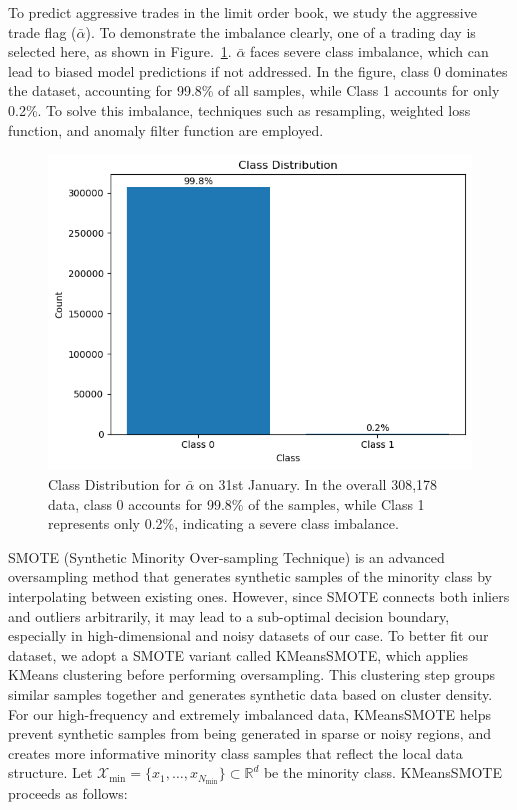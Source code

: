 To predict aggressive trades in the limit order book, we study the aggressive trade flag ($\bar{\alpha}$). To demonstrate the imbalance clearly, one of a trading day is selected here, as shown in Figure.~\ref{fig: aflag_class_distribution}. $\bar{\alpha}$ faces severe class imbalance, which can lead to biased model predictions if not addressed. In the figure, class 0 dominates the dataset, accounting for 99.8\% of all samples, while Class 1 accounts for only 0.2\%. To solve this imbalance, techniques such as resampling, weighted loss function, and anomaly filter function are employed. 
\begin{figure}[h]
    \centering
    \includegraphics[width=0.8\linewidth]{figures/Imbalaced data for aflag.png}
    \caption{Class Distribution for $\bar{\alpha}$ on 31st January. In the overall 308,178 data, class 0 accounts for 99.8\% of the samples, while Class 1 represents only 0.2\%, indicating a severe class imbalance.}
    \label{fig: aflag_class_distribution}
\end{figure}

SMOTE (Synthetic Minority Over-sampling Technique) is an advanced oversampling method that generates synthetic samples of the minority class by interpolating between existing ones. However, since SMOTE connects both inliers and outliers arbitrarily, it may lead to a sub-optimal decision boundary, especially in high-dimensional and noisy datasets of our case. To better fit our dataset, we adopt a SMOTE variant called KMeansSMOTE, which applies KMeans clustering before performing oversampling. This clustering step groups similar samples together and generates synthetic data based on cluster density. For our high-frequency and extremely imbalanced data, KMeansSMOTE helps prevent synthetic samples from being generated in sparse or noisy regions, and creates more informative minority class samples that reflect the local data structure.
Let $\mathcal{X}_{\text{min}} = \{x_1, \dots, x_{N_{\text{min}}}\} \subset \mathbb{R}^d$ be the minority class. KMeansSMOTE proceeds as follows:

